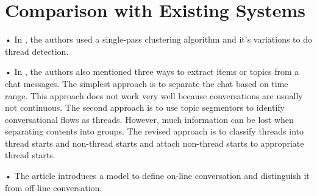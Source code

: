 \section{Comparison with Existing Systems}

 
	• In \cite{10.1145/1148170.1148180:1}, the authors used a single-pass clustering algorithm and it's variations to do thread detection.
	 
	• In \cite{khan2002mining:2}, the authors also mentioned three ways to extract items or topics from a chat messages. The simplest approach is to separate the chat based on time range. This approach does not work very well because conversations are usually not continuous. The second approach is to use topic segmentors to identify conversational flows as threads. However, much information can be lost when separating contents into groups. The revised approach is to classify threads into thread starts and non-thread starts and attach non-thread starts to appropriate thread starts. 
	
	• The article \cite{magnani2012conversation:3} introduces a model to define on-line conversation and distinguish it from off-line conversation.
	
	